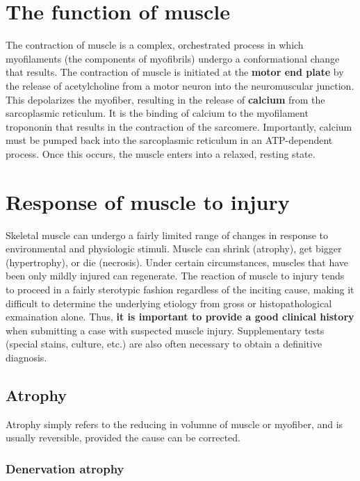 \documentclass[openany]{book}
\begin{document}
\section{The function of muscle}\label{the-function-of-muscle}

The contraction of muscle is a complex, orchestrated process in which
myofilaments (the components of myofibrils) undergo a conformational
change that results. The contraction of muscle is initiated at the
\textbf{motor end plate} by the release of acetylcholine from a motor
neuron into the neuromuscular junction. This depolarizes the myofiber,
resulting in the release of \textbf{calcium} from the sarcoplasmic
reticulum. It is the binding of calcium to the myofilament tropononin
that results in the contraction of the sarcomere. Importantly, calcium
must be pumped back into the sarcoplasmic reticulum in an ATP-dependent
process. Once this occurs, the muscle enters into a relaxed, resting
state.

\section{Response of muscle to
injury}\label{response-of-muscle-to-injury}

Skeletal muscle can undergo a fairly limited range of changes in
response to environmental and physiologic stimuli. Muscle can shrink
(atrophy), get bigger (hypertrophy), or die (necrosis). Under certain
circumstances, muscles that have been only mildly injured can
regenerate. The reaction of muscle to injury tends to proceed in a
fairly sterotypic fashion regardless of the inciting cause, making it
difficult to determine the underlying etiology from gross or
histopathological exmaination alone. Thus, \textbf{it is important to
provide a good clinical history} when submitting a case with suspected
muscle injury. Supplementary tests (special stains, culture, etc.) are
also often necessary to obtain a definitive diagnosis.

\subsection{Atrophy}\label{atrophy}

Atrophy simply refers to the reducing in volumne of muscle or myofiber,
and is usually reversible, provided the cause can be corrected.

\subsubsection{Denervation atrophy}\label{denervation-atrophy}
\end{document}
